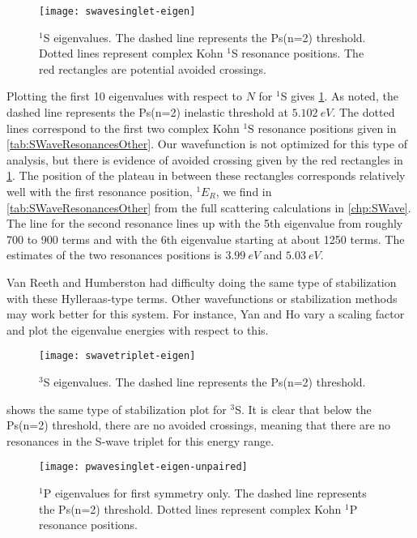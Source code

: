 \documentclass[Dissertation.tex]{subfiles}
\begin{document}
\begin{figure}
	\centering
	\texttt{[image: swavesinglet-eigen]}
	\caption[$^1$S eigenvalues]{$^1$S eigenvalues. The dashed line represents the Ps(n=2) threshold. Dotted lines represent complex Kohn $^1$S resonance positions. The red rectangles are potential avoided crossings.}
	\label{fig:swavesinglet-eigen}
\end{figure}

Plotting the first 10 eigenvalues with respect to $N$ for $^1$S gives
\cref{fig:swavesinglet-eigen}. As noted, the dashed line represents the Ps(n=2) 
inelastic threshold at $\SI{5.102}{eV}$. The dotted lines correspond to the 
first two complex Kohn $^1$S resonance positions given in
\cref{tab:SWaveResonancesOther}. Our wavefunction is not optimized for this type of 
analysis, but there is evidence of avoided crossing given by the red 
rectangles in \cref{fig:swavesinglet-eigen}. The position of the plateau in 
between these rectangles corresponds relatively well with the first resonance 
position, $^1E_R$, we find in \cref{tab:SWaveResonancesOther} from the full 
scattering calculations in \cref{chp:SWave}. The line for the second 
resonance lines up with the 5th eigenvalue from roughly 700 to 900 terms and 
with the 6th eigenvalue starting at about 1250 terms. %
The estimates of the two resonances positions is $\SI{3.99}{eV}$ 
and $\SI{5.03}{eV}$.

Van Reeth and Humberston \cite{VanReeth2004} had difficulty doing the same 
type of stabilization with these Hylleraas-type terms. Other wavefunctions or 
stabilization methods may work better for this system. For instance, Yan and 
Ho \cite{Yan2003} vary a scaling factor and plot the eigenvalue energies
with respect to this.

\begin{figure}
	\centering
	\texttt{[image: swavetriplet-eigen]}
	\caption[$^3$S eigenvalues]{$^3$S eigenvalues. The dashed line represents the Ps(n=2) threshold.}
	\label{fig:swavetriplet-eigen}
\end{figure}

 shows the same type of stabilization plot for
$^3$S. It is clear that below the Ps(n=2) threshold, there are no avoided 
crossings, meaning that there are no resonances in the S-wave triplet for 
this energy range. 

\begin{figure}
	\centering
	\texttt{[image: pwavesinglet-eigen-unpaired]}
	\caption[$^1$P eigenvalues for first symmetry only]{$^1$P eigenvalues for first symmetry only. The dashed line represents the Ps(n=2) threshold. Dotted lines represent complex Kohn $^1$P resonance positions.}
	\label{fig:pwavesinglet-eigen-unpaired}
\end{figure}
\end{document}
